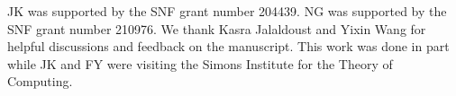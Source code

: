 JK was supported by the SNF grant number 204439. NG was supported by the SNF grant number 210976. We thank Kasra Jalaldoust and Yixin Wang for helpful discussions and feedback on the manuscript. This work was done in part while JK and FY were visiting the Simons Institute for the Theory of Computing.